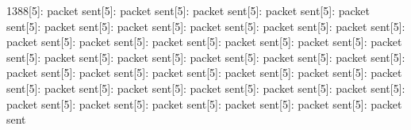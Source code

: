 \documentclass[parskip]{cs4rep}
\begin{document}
1388[5]: packet sent[5]: packet sent[5]: packet sent[5]: packet sent[5]: packet sent[5]: packet sent[5]: packet sent[5]: packet sent[5]: packet sent[5]: packet sent[5]: packet sent[5]: packet sent[5]: packet sent[5]: packet sent[5]: packet sent[5]: packet sent[5]: packet sent[5]: packet sent[5]: packet sent[5]: packet sent[5]: packet sent[5]: packet sent[5]: packet sent[5]: packet sent[5]: packet sent[5]: packet sent[5]: packet sent[5]: packet sent[5]: packet sent[5]: packet sent[5]: packet sent[5]: packet sent[5]: packet sent[5]: packet sent[5]: packet sent[5]: packet sent[5]: packet sent[5]: packet sent\newline
\end{document}
